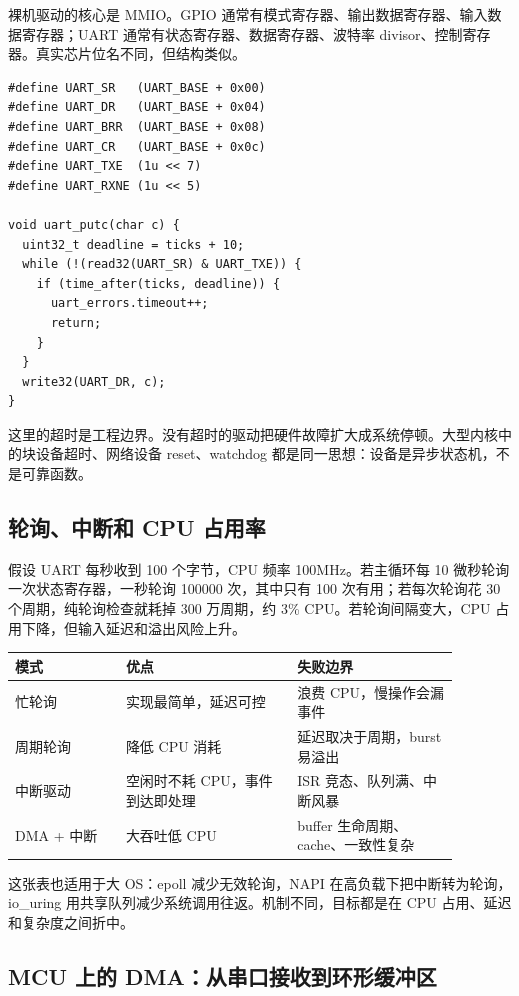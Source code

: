 裸机驱动的核心是 MMIO。GPIO 通常有模式寄存器、输出数据寄存器、输入数据寄存器；UART 通常有状态寄存器、数据寄存器、波特率 divisor、控制寄存器。真实芯片位名不同，但结构类似。

\begin{lstlisting}
#define UART_SR   (UART_BASE + 0x00)
#define UART_DR   (UART_BASE + 0x04)
#define UART_BRR  (UART_BASE + 0x08)
#define UART_CR   (UART_BASE + 0x0c)
#define UART_TXE  (1u << 7)
#define UART_RXNE (1u << 5)

void uart_putc(char c) {
  uint32_t deadline = ticks + 10;
  while (!(read32(UART_SR) & UART_TXE)) {
    if (time_after(ticks, deadline)) {
      uart_errors.timeout++;
      return;
    }
  }
  write32(UART_DR, c);
}
\end{lstlisting}

这里的超时是工程边界。没有超时的驱动把硬件故障扩大成系统停顿。大型内核中的块设备超时、网络设备 reset、watchdog 都是同一思想：设备是异步状态机，不是可靠函数。

\subsection{轮询、中断和 CPU 占用率}

假设 UART 每秒收到 100 个字节，CPU 频率 100MHz。若主循环每 10 微秒轮询一次状态寄存器，一秒轮询 100000 次，其中只有 100 次有用；若每次轮询花 30 个周期，纯轮询检查就耗掉 300 万周期，约 3\% CPU。若轮询间隔变大，CPU 占用下降，但输入延迟和溢出风险上升。

\begin{longtable}{p{0.22\linewidth}p{0.34\linewidth}p{0.32\linewidth}}
\toprule
模式 & 优点 & 失败边界 \\
\midrule
忙轮询 & 实现最简单，延迟可控 & 浪费 CPU，慢操作会漏事件 \\
周期轮询 & 降低 CPU 消耗 & 延迟取决于周期，burst 易溢出 \\
中断驱动 & 空闲时不耗 CPU，事件到达即处理 & ISR 竞态、队列满、中断风暴 \\
DMA + 中断 & 大吞吐低 CPU & buffer 生命周期、cache、一致性复杂 \\
\bottomrule
\end{longtable}

这张表也适用于大 OS：epoll 减少无效轮询，NAPI 在高负载下把中断转为轮询，io\_uring 用共享队列减少系统调用往返。机制不同，目标都是在 CPU 占用、延迟和复杂度之间折中。

\subsection{MCU 上的 DMA：从串口接收到环形缓冲区}

